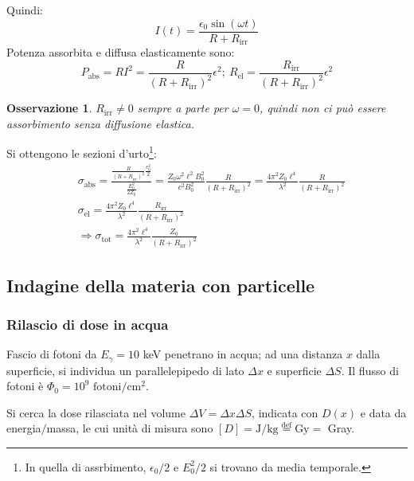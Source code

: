 \documentclass[10pt, a4paper]{scrartcl}
\numberwithin{equation}{subsection}
\theoremstyle{style1}
\newtheorem{osservazione}{Osservazione}[section]
\begin{document}
Quindi:
\begin{equation}
	I(t) = \frac{\epsilon_0 \sin(\omega t)}{R+R_\text{irr}}
\end{equation}
Potenza assorbita e diffusa elasticamente sono:
\begin{equation}
	P_\text{abs}= RI^2 =\frac{R}{(R+R_\text{irr})^2}\epsilon ^2; \ R_\text{el} = \frac{R_\text{irr}}{(R+R_\text{irr})^2} \epsilon ^2
\end{equation}
\begin{osservazione}
	$R_\text{irr}\neq 0$ sempre a parte per $\omega = 0$, quindi non ci pu\`o essere assorbimento senza diffusione elastica.
\end{osservazione}
\noindent Si ottengono le sezioni d'urto\footnote{In quella di assrbimento, $\epsilon_0 / 2$ e $E_0^2 / 2$ si trovano da media temporale.}:
\begin{equation}
	\begin{split}
		&\sigma _\text{abs}=\frac{\frac{R}{(R+R_\text{irr})^2} \frac{\epsilon_0^2}{2}}{\frac{E_0^2}{2Z_0}}= \frac{Z_0 \omega^2 \ell ^2 B_0^2}{c^2 B_0^2} \frac{R}{(R+R_\text{irr})^2} = \frac{4\pi^2 Z_0 \ell ^4}{\lambda ^2} \frac{R}{(R+R_\text{irr})^2}\\
		& \sigma _\text{el}= \frac{4\pi^2 Z_0\ell ^4}{\lambda ^2} \frac{R_\text{irr}}{(R+R_\text{irr})^2}\\
		&\Rightarrow \sigma _\text{tot}= \frac{4\pi^2 \ell ^4}{\lambda ^2} \frac{Z_0}{(R+R_\text{irr})^2}
	\end{split}
\end{equation}

\newpage
\subsection{Indagine della materia con particelle}
\subsubsection{Rilascio di dose in acqua}
Fascio di fotoni da $E_\gamma = 10$ keV penetrano in acqua; ad una distanza $x$ dalla superficie, si individua un parallelepipedo di lato $\Delta x$ e superficie $\Delta S$. Il flusso di fotoni \`e $\Phi_0 = 10^9 \text{ fotoni}/\text{cm}^2$.

Si cerca la dose rilasciata nel volume $\Delta V = \Delta x \Delta S$, indicata con $D(x)$ e data da energia$/$massa, le cui unit\`a di misura sono $\left[ D \right] = \text{J}/\text{kg} \overset{\text{def}}{=} \text{Gy}=$ Gray.
\end{document}
